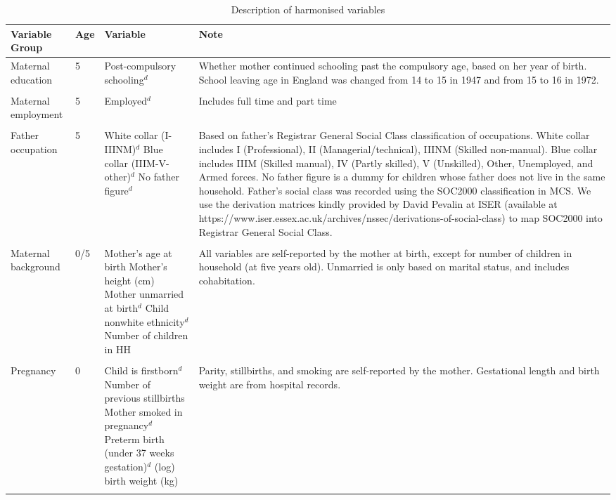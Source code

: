 
\begin{sidewaystable}[ht!]
\caption{Description of harmonised variables}\label{tab:harmvar}
\centering{} \scriptsize
\begin{tabular}{L{.18\textwidth}C{.1\textwidth}L{.3\textwidth}L{.75\textwidth}}
\toprule
Variable Group & Age & Variable & Note \\
\midrule
Maternal education & 5 & Post-compulsory schooling$^d$ & Whether mother continued schooling past the compulsory age, based on her year of birth. School leaving age in England was changed from 14 to 15 in 1947 and from 15 to 16 in 1972. \\ \\[-1.5em]
Maternal employment & 5 & Employed$^d$ & Includes full time and part time \\ \\[-1.5em]
Father occupation & 5 & White collar (I-IIINM)$^d$ \newline Blue collar (IIIM-V-other)$^d$ \newline No father figure$^d$ & Based on father's Registrar General Social Class classification of occupations. White collar includes I (Professional), II (Managerial/technical), IIINM (Skilled non-manual). Blue collar includes IIIM (Skilled manual), IV (Partly skilled), V (Unskilled), Other, Unemployed, and Armed forces. No father figure is a dummy for children whose father does not live in the same household. Father's social class was recorded using the SOC2000 classification in MCS. We use the derivation matrices kindly provided by David Pevalin at ISER (available at https://www.iser.essex.ac.uk/archives/nssec/derivations-of-social-class) to map SOC2000 into Registrar General Social Class. \\ \\[-1.5em]
Maternal background & 0/5 & Mother's age at birth \newline Mother's height (cm) \newline Mother unmarried at birth$^d$ \newline Child nonwhite ethnicity$^d$  \newline Number of children in HH & All variables are self-reported by the mother at birth, except for number of children in household (at five years old). Unmarried is only based on marital status, and includes cohabitation. \\ \\[-1.5em]
Pregnancy & 0 & Child is firstborn$^d$ \newline Number of previous stillbirths \newline Mother smoked in pregnancy$^d$ \newline Preterm birth (under 37 weeks gestation)$^d$ \newline (log) birth weight (kg) & Parity, stillbirths, and smoking are self-reported by the mother. Gestational length and birth weight are from hospital records. \\ \\[-1.5em]

\end{tabular}
\end{sidewaystable}
